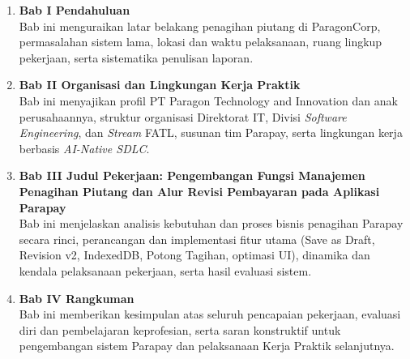 \begin{enumerate}[label=\arabic*)]
\item \textbf{Bab I Pendahuluan}\\
Bab ini menguraikan latar belakang penagihan piutang di ParagonCorp, permasalahan sistem lama, lokasi dan waktu pelaksanaan, ruang lingkup pekerjaan, serta sistematika penulisan laporan.

\item \textbf{Bab II Organisasi dan Lingkungan Kerja Praktik}\\
Bab ini menyajikan profil PT Paragon Technology and Innovation dan anak perusahaannya, struktur organisasi Direktorat IT, Divisi \textit{Software Engineering}, dan \textit{Stream} FATL, susunan tim Parapay, serta lingkungan kerja berbasis \textit{AI-Native SDLC}.

\item \textbf{Bab III Judul Pekerjaan: Pengembangan Fungsi Manajemen Penagihan Piutang dan Alur Revisi Pembayaran pada Aplikasi Parapay}\\
Bab ini menjelaskan analisis kebutuhan dan proses bisnis penagihan Parapay secara rinci, perancangan dan implementasi fitur utama (Save as Draft, Revision v2, IndexedDB, Potong Tagihan, optimasi UI), dinamika dan kendala pelaksanaan pekerjaan, serta hasil evaluasi sistem.

\item \textbf{Bab IV Rangkuman}\\
Bab ini memberikan kesimpulan atas seluruh pencapaian pekerjaan, evaluasi diri dan pembelajaran keprofesian, serta saran konstruktif untuk pengembangan sistem Parapay dan pelaksanaan Kerja Praktik selanjutnya.
\end{enumerate}
